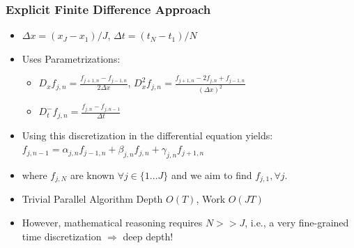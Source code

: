 \documentclass{beamer}
\begin{document}
\begin{frame}[fragile,t]
  \frametitle{Explicit Finite Difference Approach}

\begin{itemize}
    \item $\Delta x = (x_{J}-x_{1})/J$, $\Delta t = (t_{N}-t_{1})/N$\smallskip
    \item Uses Parametrizations:
        \begin{itemize}
            \item $D_xf_{j,n} = \frac{f_{j+1,n}-f_{j-1,n}}{2\Delta x}$,
                  $D_x^2f_{j,n} = \frac{f_{j+1,n}-2f_{j,n}+f_{j-1,n}}{(\Delta x)^2}$
            \item \alert{$D_t^{-}f_{j,n} = \frac{f_{j,n} - f_{j,n-1}}{\Delta t}$} 
        \end  {itemize}\smallskip
    \item Using this discretization in the differential equation yields:\\
             $f_{j,n-1} = \alpha_{j,n}f_{j-1,n} + \beta_{j,n}f_{j,n} + \gamma_{j,n}f_{j+1,n}$\smallskip
    \item where $f_{j,N}$ are known $\forall j \in \{1\ldots J\}$ and 
             we aim to find $f_{j,1}, \forall j$.\smallskip
    \item Trivial Parallel Algorithm Depth $O(T)$, Work $O(JT)$\smallskip

    \item \alert{However, mathematical reasoning requires $N >> J$, i.e.,
            a very fine-grained time discretization $\Rightarrow$ deep depth!}
\end  {itemize}


\end{frame}
\end{document}
